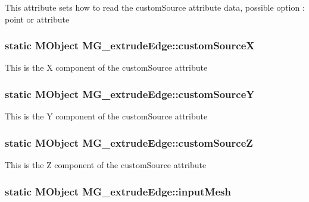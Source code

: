 This attribute sets how to read the custom\-Source attribute data, possible option \-: point or attribute \hypertarget{class_m_g__extrude_edge_aa00c8eee45d314e14ba5694800fc9a46}{
\subsubsection[{custom\-Source\-X}]{\setlength{\rightskip}{0pt plus 5cm}static M\-Object M\-G\-\_\-extrude\-Edge\-::custom\-Source\-X\hspace{0.3cm}{\ttfamily [static]}}}\label{class_m_g__extrude_edge_aa00c8eee45d314e14ba5694800fc9a46}
This is the X component of the custom\-Source attribute \hypertarget{class_m_g__extrude_edge_a120e3fd5173dce6aa14f7cc2fe2647e9}{
\subsubsection[{custom\-Source\-Y}]{\setlength{\rightskip}{0pt plus 5cm}static M\-Object M\-G\-\_\-extrude\-Edge\-::custom\-Source\-Y\hspace{0.3cm}{\ttfamily [static]}}}\label{class_m_g__extrude_edge_a120e3fd5173dce6aa14f7cc2fe2647e9}
This is the Y component of the custom\-Source attribute \hypertarget{class_m_g__extrude_edge_aa4f066c45836661f0a1066c5f8373a35}{
\subsubsection[{custom\-Source\-Z}]{\setlength{\rightskip}{0pt plus 5cm}static M\-Object M\-G\-\_\-extrude\-Edge\-::custom\-Source\-Z\hspace{0.3cm}{\ttfamily [static]}}}\label{class_m_g__extrude_edge_aa4f066c45836661f0a1066c5f8373a35}
This is the Z component of the custom\-Source attribute \hypertarget{class_m_g__extrude_edge_a0933668cde5a769442b3110e75387110}{
\subsubsection[{input\-Mesh}]{\setlength{\rightskip}{0pt plus 5cm}static M\-Object M\-G\-\_\-extrude\-Edge\-::input\-Mesh\hspace{0.3cm}{\ttfamily [static]}}}\label{class_m_g__extrude_edge_a0933668cde5a769442b3110e75387110}
